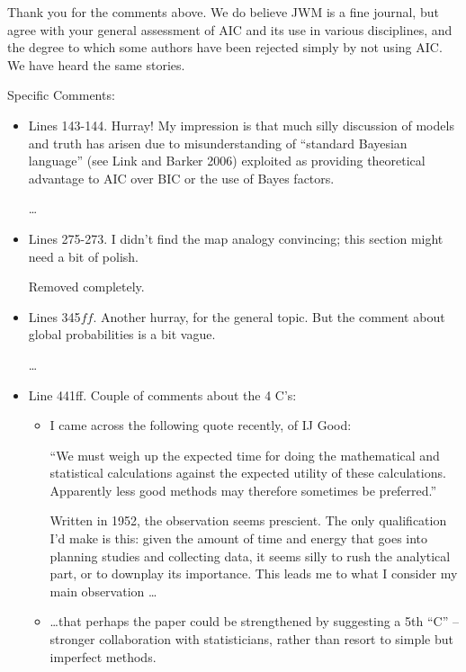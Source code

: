 \documentclass[12pt, titlepage]{article}
\begin{document}
Thank you for the comments above.  We do believe JWM is a fine journal, but agree with your general assessment of AIC and its use in various disciplines, and the degree to which some authors have been rejected simply by not using AIC.  We have heard the same stories.

\vspace{.5cm}
{\color{red!70!black} \noindent \Large Specific Comments:}

\begin{itemize}
\item {\color{red!70!black} Lines 143-144. Hurray! My impression is that much silly discussion of models and truth has arisen due to misunderstanding of “standard Bayesian language” (see Link and Barker 2006) exploited as providing theoretical advantage to AIC over BIC or the use of Bayes factors. }

  \dots

\item {\color{red!70!black} Lines 275-273. I didn’t find the map analogy convincing; this section might need a bit of polish.}

  Removed completely.

\item {\color{red!70!black} Lines 345$ff$. Another hurray, for the general topic. But the comment about global probabilities is a bit vague.}

 \dots

\item {\color{red!70!black}Line 441ff. Couple of comments about the 4 C’s:

  \begin{itemize}

    \item I came across the following quote recently, of IJ Good: 

      ``We must weigh up the expected time for doing the mathematical and statistical calculations against the expected utility of these calculations. Apparently less good methods may therefore sometimes be preferred.''

Written in 1952, the observation seems prescient. The only qualification I’d make is this: given the amount of time and energy that goes into planning studies and collecting data, it seems silly to rush the analytical part, or to downplay its importance. This leads me to what I consider my main observation \dots

    \item \dots that perhaps the paper could be strengthened by suggesting a 5th ``C'' – stronger collaboration with statisticians, rather than resort to simple but imperfect methods. 


\end{itemize}}
\end{itemize}
\end{document}
